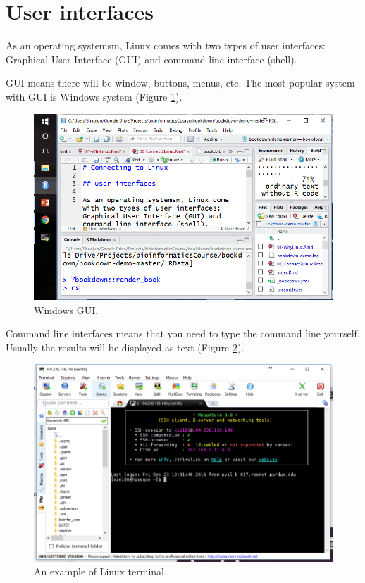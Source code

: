 \documentclass[]{book}
\theoremstyle{definition}
\theoremstyle{definition}
\theoremstyle{definition}
\theoremstyle{remark}
\begin{document}
\section{User interfaces}\label{user-interfaces}

As an operating systemsm, Linux comes with two types of user interfaces:
Graphical User Interface (GUI) and command line interface (shell).

GUI means there will be window, buttons, menus, etc. The most popular
system with GUI is Windows system (Figure \ref{fig:windowsGUI}).



\begin{figure}
\centering
\includegraphics{figures/windows_gui.png}
\caption{\label{fig:windowsGUI}Windows GUI.}
\end{figure}

Command line interfaces means that you need to type the command line
yourself. Usually the results will be displayed as text (Figure
\ref{fig:linuxTerminalExam2}).



\begin{figure}
\centering
\includegraphics{figures/linux_terminal_exam2.png}
\caption{\label{fig:linuxTerminalExam2}An example of Linux terminal.}
\end{figure}
\end{document}

